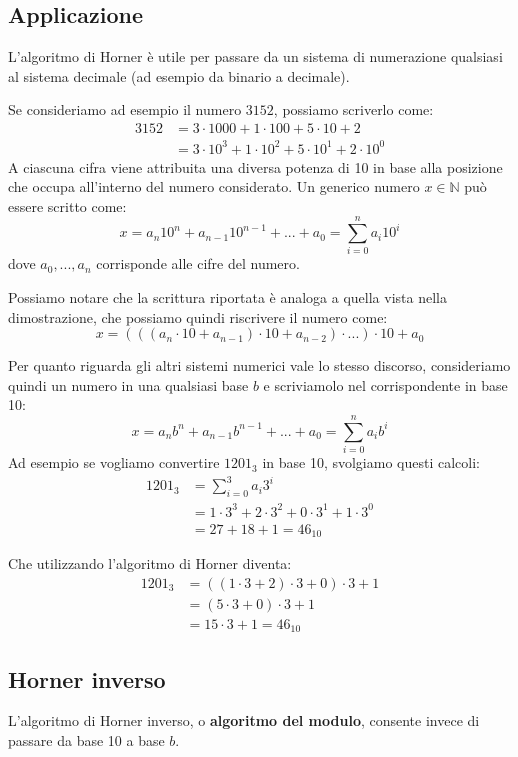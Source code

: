 \documentclass[../main.tex]{subfiles}
\begin{document}
\pagebreak
\subsection{Applicazione}
L'algoritmo di Horner è utile per passare da un sistema di numerazione qualsiasi al sistema decimale (ad esempio da binario a decimale).

Se consideriamo ad esempio il numero $3152$, possiamo scriverlo come:
\begin{align*}
    3152  &= 3 \cdot 1000 + 1 \cdot 100 + 5 \cdot 10 + 2 \\
    &= 3 \cdot 10^3 + 1 \cdot 10^2 + 5 \cdot 10^1 + 2 \cdot 10^0
\end{align*}
A ciascuna cifra viene attribuita una diversa potenza di 10 in base alla posizione che occupa all'interno del numero considerato. Un generico numero $x \in \mathbb{N}$ può essere scritto come:
$$
    x = a_n10^n + a_{n-1}10^{n-1} + ... + a_0 = \sum_{i=0}^{n} a_i10^i
$$
dove $a_0,...,a_n$ corrisponde alle cifre del numero.

Possiamo notare che la scrittura riportata è analoga a quella vista nella dimostrazione, che possiamo quindi riscrivere il numero come:
$$
    x = (((a_n \cdot 10 + a_{n-1}) \cdot 10 + a_{n-2}) \cdot ...) \cdot 10 + a_0
$$

Per quanto riguarda gli altri sistemi numerici vale lo stesso discorso, consideriamo quindi un numero in una qualsiasi base $b$ e scriviamolo nel corrispondente in base 10:
$$
    x = a_nb^n + a_{n-1}b^{n-1} + ... + a_0 = \sum_{i=0}^{n} a_ib^i
$$
Ad esempio se vogliamo convertire $1201_3$ in base 10, svolgiamo questi calcoli:
\begin{align*}
    1201_3 &= \sum_{i=0}^{3} a_i3^i \\
    &=1 \cdot 3^3 + 2 \cdot 3^2 + 0 \cdot 3^1 + 1 \cdot 3^0 \\
    &=27 + 18 + 1 = 46_{10}
\end{align*}

Che utilizzando l'algoritmo di Horner diventa:
\begin{align*}
    1201_3 &= ((1 \cdot 3 + 2) \cdot 3 + 0) \cdot 3 + 1 \\
    &= (5 \cdot 3 + 0) \cdot 3 + 1 \\
    &= 15 \cdot 3 + 1 = 46_{10}
\end{align*}

\subsection{Horner inverso}
L'algoritmo di Horner inverso, o \textbf{algoritmo del modulo}, consente invece di passare da base 10 a base $b$.
\end{document}
